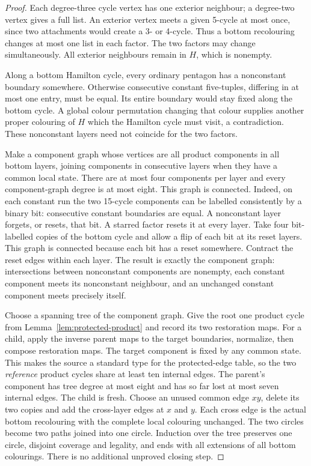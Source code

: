 \documentclass[11pt]{article}
\theoremstyle{remark}
\numberwithin{equation}{section}
\begin{document}
\begin{proof}
Each degree-three cycle vertex has one exterior neighbour; a
degree-two vertex gives a full list. An exterior vertex meets a
given 5-cycle at most once, since two attachments would create a
3- or 4-cycle. Thus a bottom recolouring changes at most one list
in each factor. The two factors may change simultaneously.
All exterior neighbours remain in $H$, which is nonempty.

Along a bottom Hamilton cycle, every ordinary pentagon has a
nonconstant boundary somewhere. Otherwise consecutive constant
five-tuples, differing in at most one entry, must be equal.
Its entire boundary would stay fixed along the bottom cycle.
A global colour permutation changing that colour supplies another
proper colouring of $H$ which the Hamilton cycle must visit,
a contradiction. These nonconstant layers need not coincide
for the two factors.

Make a component graph whose vertices are all product components
in all bottom layers, joining components in consecutive layers
when they have a common local state. There are at most four components
per layer and every component-graph degree is at most eight.
This graph is connected. Indeed, on each constant run the two
15-cycle components can be labelled consistently by a binary bit:
consecutive constant boundaries are equal. A nonconstant layer
forgets, or resets, that bit. A starred factor resets it at every layer.
Take four bit-labelled copies of the bottom cycle and allow a flip of
each bit at its reset layers. This graph is connected because each
bit has a reset somewhere. Contract the reset edges within each
layer. The result is exactly the component graph: intersections
between nonconstant components are nonempty, each constant component
meets its nonconstant neighbour, and an unchanged constant component
meets precisely itself.

Choose a spanning tree of the component graph. Give the root one
product cycle from Lemma~\ref{lem:protected-product} and record its
two restoration maps. For a child, apply the inverse parent maps
to the target boundaries, normalize, then compose restoration maps.
The target component is fixed by any common state. This makes the
source a standard type for the protected-edge table, so the
two \emph{reference} product cycles share at least ten internal edges.
The parent's component has tree degree at most eight and has so far
lost at most seven internal edges. The child is fresh.
Choose an unused common edge $xy$, delete its two copies and add
the cross-layer edges at $x$ and $y$. Each cross edge is the actual
bottom recolouring with the complete local colouring unchanged.
The two circles become two paths joined into one circle.
Induction over the tree preserves one circle, disjoint coverage and
legality, and ends with all extensions of all bottom colourings.
There is no additional unproved closing step.
\end{proof}
\end{document}
